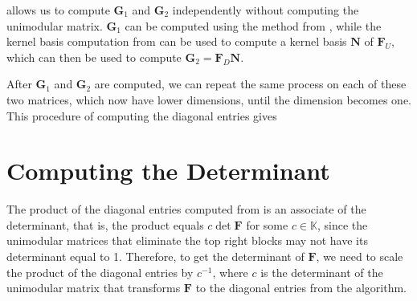  allows us to compute $\mathbf{G}_{1}$
and $\mathbf{G}_{2}$ independently without computing the unimodular
matrix. $\mathbf{G}_{1}$ can be computed using the method from ,
while the kernel basis computation from 
can be used to compute a kernel basis $\mathbf{N}$ of $\mathbf{F}_{U}$,
which can then be used to compute $\mathbf{G}_{2}=\mathbf{F}_{D}\mathbf{N}$.

After $\mathbf{G}_{1}$ and $\mathbf{G}_{2}$ are computed, we can
repeat the same process on each of these two matrices, which now have
lower dimensions, until the dimension becomes one. This procedure
of computing the diagonal entries gives 




\section{Computing the Determinant}

The product of the diagonal entries computed from 
is an associate of the determinant, that is, the product equals $c\det\mathbf{F}$
for some $c\in\mathbb{K}$, since the unimodular matrices that eliminate
the top right blocks may not have its determinant equal to 1. Therefore,
to get the determinant of $\mathbf{F}$, we need to scale the product
of the diagonal entries by $c^{-1}$, where $c$ is the determinant
of the unimodular matrix that transforms $\mathbf{F}$ to the diagonal
entries from the algorithm.


